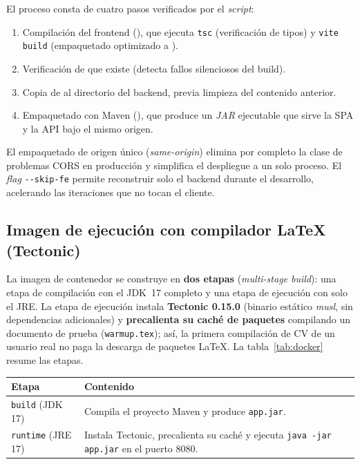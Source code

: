El proceso consta de cuatro pasos verificados por el \textit{script}:

\begin{enumerate}[noitemsep]
    \item Compilación del frontend (), que ejecuta \texttt{tsc}
    (verificación de tipos) y \texttt{vite build} (empaquetado optimizado a ).
    \item Verificación de que  existe (detecta fallos silenciosos del build).
    \item Copia de  al directorio  del
    backend, previa limpieza del contenido anterior.
    \item Empaquetado con Maven (), que produce un \textit{JAR}
    ejecutable que sirve la SPA y la API bajo el mismo origen.
\end{enumerate}

\begin{NotaTecnica}
El empaquetado de origen único (\textit{same-origin}) elimina por completo la clase de
problemas CORS en producción y simplifica el despliegue a un solo proceso. El \textit{flag}
\texttt{-{}-skip-fe} permite reconstruir solo el backend durante el desarrollo, acelerando
las iteraciones que no tocan el cliente.
\end{NotaTecnica}

\subsection{Imagen de ejecución con compilador LaTeX (Tectonic)}
\label{subsec:docker}

La imagen de contenedor se construye en \textbf{dos etapas} (\textit{multi-stage build}):
una etapa de compilación con el JDK~17 completo y una etapa de ejecución con solo el JRE.
La etapa de ejecución instala \textbf{Tectonic 0.15.0} (binario estático \textit{musl},
sin dependencias adicionales) y \textbf{precalienta su caché de paquetes} compilando un
documento de prueba (\texttt{warmup.tex}); así, la primera compilación de CV de un usuario
real no paga la descarga de paquetes LaTeX. La tabla~\ref{tab:docker} resume las etapas.

\vspace{0.2cm}
\noindent
\renewcommand{\arraystretch}{1.3}
\fontsize{8.5}{10.2}\selectfont\sffamily
\begin{tabularx}{\textwidth}{|L{3.4cm}|Y|}
\hline
{}
\sffamily\textbf{Etapa} & \sffamily\textbf{Contenido} \\
\hline
\texttt{build} (JDK 17) & Compila el proyecto Maven y produce \texttt{app.jar}. \\ \hline
{}
\texttt{runtime} (JRE 17) & Instala Tectonic, precalienta su caché y ejecuta \texttt{java -jar app.jar} en el puerto 8080. \\ \hline
\end{tabularx}
\label{tab:docker}

